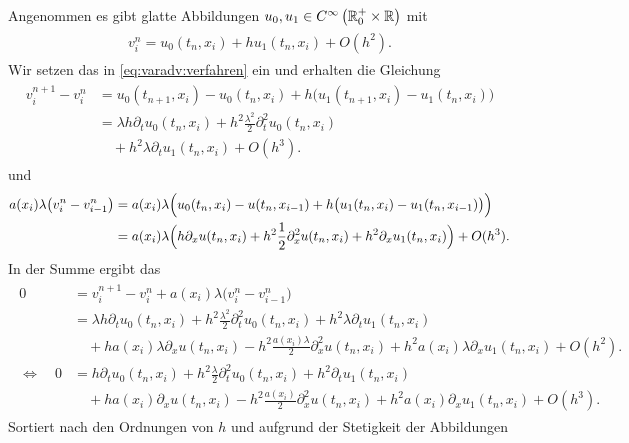 Angenommen es gibt glatte Abbildungen $u_0, u_1 \in C^{\infty}\left( \mathbb R^+_0 \times \mathbb R \right)$ mit
\begin{align}\label{eq:varadv:reg:ansatz}
\begin{split}
v^n_i = u_0(t_n, x_i) + h u_1(t_n, x_i) + O(h^2).
\end{split}
\end{align}
Wir setzen das in \eqref{eq:varadv:verfahren} ein und erhalten die Gleichung
\begin{align}
\begin{split}
v^{n+1}_i - v^n_i &= u_0(t_{n+1}, x_i) - u_0(t_n, x_i) + h \bigl( u_1(t_{n+1}, x_i) - u_1(t_n, x_i) \bigr)\\
&= \lambda h \partial_t u_0(t_n, x_i) + h^2 \frac{\lambda^2}{2} \partial^2_t u_0(t_n, x_i)\\
&\quad + h^2 \lambda \partial_t u_1(t_n, x_i) + O(h^3).
\end{split}
\end{align}
und
\begin{align}
\begin{split}
a(x_i) \lambda \bigl( v^n_i - v^n_{i-1} \bigr) &= a(x_i) \lambda \Bigl( u_0(t_n, x_i) - u(t_n, x_{i-1}) + h \bigl( u_1(t_n, x_i) - u_1(t_n, x_{i-1}) \bigr) \Bigr)\\
&= a(x_i) \lambda \Bigl( h \partial_x u(t_n, x_i) + h^2 \frac{1}{2} \partial^2_x u(t_n, x_i) + h^2 \partial_x u_1(t_n, x_i) \Bigr) + O(h^3).
\end{split}
\end{align}
In der Summe ergibt das
\begin{align}
\begin{split}
0 &= v^{n+1}_i - v^n_i + a(x_i) \lambda \bigl( v^n_i - v^n_{i-1} \bigr)\\
&= \lambda h \partial_t u_0(t_n, x_i) + h^2 \frac{\lambda^2}{2} \partial^2_t u_0(t_n, x_i) + h^2 \lambda \partial_t u_1(t_n, x_i)\\
&\quad + h a(x_i) \lambda \partial_x u(t_n, x_i) - h^2 \frac{a(x_i) \lambda}{2} \partial^2_x u(t_n, x_i) + h^2 a(x_i) \lambda \partial_x u_1(t_n, x_i) + O(h^2).\\
\Leftrightarrow \quad 0 &= h \partial_t u_0(t_n, x_i) + h^2 \frac{\lambda}{2} \partial^2_t u_0(t_n, x_i) + h^2 \partial_t u_1(t_n, x_i)\\
&\quad + h a(x_i) \partial_x u(t_n, x_i) - h^2 \frac{a(x_i)}{2} \partial^2_x u(t_n, x_i) + h^2 a(x_i) \partial_x u_1(t_n, x_i) + O(h^3).
\end{split}
\end{align}
Sortiert nach den Ordnungen von $h$ und aufgrund der Stetigkeit der Abbildungen
